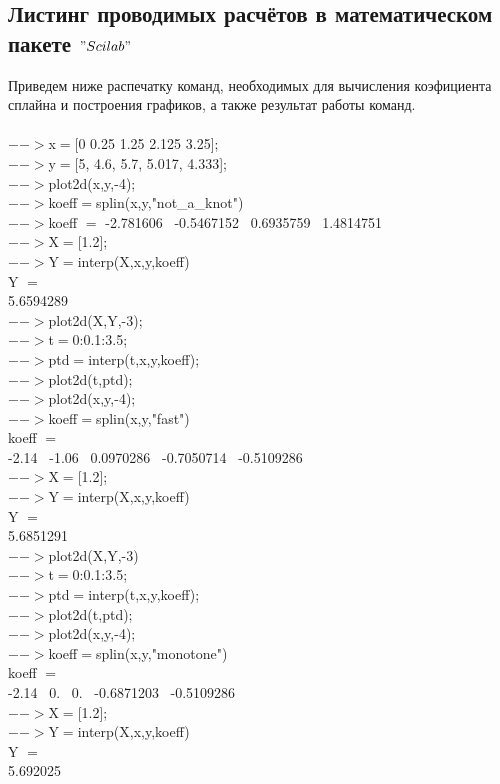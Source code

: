 \documentclass[russian,utf8,nocolumnxxxi,nocolumnxxxii]{eskdtext}
\begin{document}
\subsection{Листинг проводимых расчётов в математическом пакете $"Scilab"$}
Приведем ниже распечатку команд, необходимых для вычисления коэфициента сплайна и построения графиков, а также результат работы команд.\\
\\
$-->$x$=$[0 0.25 1.25 2.125 3.25];\\
$-->$y$=$[5, 4.6, 5.7, 5.017, 4.333];\\
$-->$plot2d(x,y,-4);\\
$-->$koeff$=$splin(x,y,"not\_a\_knot")\\
$-->$koeff $=$
-2.781606 \ -0.5467152 \ 0.6935759  \ 1.4814751 \\
$-->$X$=$[1.2];\\
$-->$Y$=$interp(X,x,y,koeff)\\
Y $=$\\
5.6594289 \\
$-->$plot2d(X,Y,-3); \\
$-->$t$=$0:0.1:3.5;\\
$-->$ptd$=$interp(t,x,y,koeff);\\
$-->$plot2d(t,ptd);\\
$-->$plot2d(x,y,-4);\\
$-->$koeff$=$splin(x,y,"fast")\\
koeff $=$\\
-2.14 \ -1.06 \ 0.0970286 \ -0.7050714 \ -0.5109286 \\
$-->$X$=$[1.2];\\
$-->$Y$=$interp(X,x,y,koeff)\\
Y $=$\\
5.6851291 \\
$-->$plot2d(X,Y,-3)\\
$-->$t$=$0:0.1:3.5;\\
$-->$ptd$=$interp(t,x,y,koeff);\\
$-->$plot2d(t,ptd);\\
$-->$plot2d(x,y,-4);\\
$-->$koeff$=$splin(x,y,"monotone")\\
koeff $=$\\
-2.14 \ 0. \ 0. \ -0.6871203 \ -0.5109286 \\
$-->$X$=$[1.2];\\
$-->$Y$=$interp(X,x,y,koeff)\\
Y $=$\\
5.692025 \\
\end{document}
